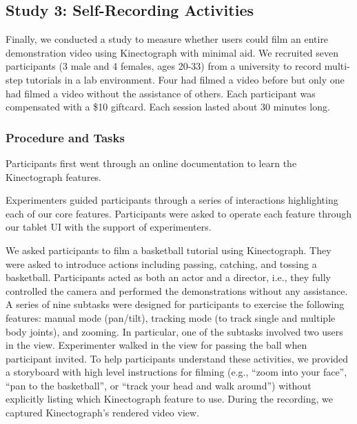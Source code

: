 \subsection{Study 3: Self-Recording Activities}

Finally, we conducted a study to measure whether users could film an entire demonstration video using Kinectograph with minimal aid.
%
We recruited seven participants (3 male and 4 females, ages 20-33) from a university to record multi-step tutorials in a lab environment. Four had filmed a video before but only one had filmed a video without the assistance of others. Each participant was compensated with a \$10 giftcard. Each session lasted about 30 minutes long.

\subsubsection{Procedure and Tasks}
 Participants first went through an online documentation to learn the Kinectograph features. %

 Experimenters guided participants through a series of interactions highlighting each of our core features. Participants were asked to operate each feature through our tablet UI with the support of experimenters.

 We asked participants to film a basketball tutorial using Kinectograph. They were asked to introduce actions including passing, catching, and tossing a basketball. Participants acted as both an actor and a director, i.e., they fully controlled the camera and performed the demonstrations without any assistance. A series of nine subtasks were designed for participants to exercise the following features: manual mode (pan/tilt), tracking mode (to track single and multiple body joints), and zooming. In particular, one of the subtasks involved two users in the view. Experimenter walked in the view for passing the ball when participant invited. To help participants understand these activities, we provided a storyboard with high level instructions for filming (e.g., ``zoom into your face'', ``pan to the basketball'', or ``track your head and walk around'') without explicitly listing which Kinectograph feature to use. During the recording, we captured Kinectograph's rendered video view.

